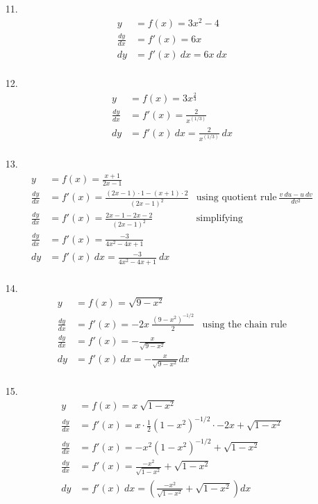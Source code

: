 \documentclass[12pt]{article}
\begin{document}
    \begin{enumerate}
        \item[11.] 
            \begin{align*}
            y &= f(x) = 3x^2 - 4 \\
            \frac{dy}{dx} &= f'(x) = 6x \\
            dy &= f'(x)~dx = 6x~dx\\
            \end{align*}

        \item[12.] 
            \begin{align*}
            y &= f(x) = 3x^{\frac{2}{3}} \\
            \frac{dy}{dx} &= f'(x) = \frac{2}{x^(1/3)}\\
            dy &= f'(x)~dx = \frac{2}{x^(1/3)}~dx\\
            \end{align*}

        \item[13.] 
            \begin{align*}
            y &= f(x) = \frac{x+1}{2x-1} \\
            \frac{dy}{dx} &= f'(x) = \frac{(2x-1)\cdot1 - (x+1)\cdot2}{(2x-1)^2} & \text{using quotient rule}~\frac{v~du - u~dv}{dv^2}\\
        	 \frac{dy}{dx} &= f'(x) = \frac{2x-1 -2x-2}{(2x-1)^2} & \text{simplifying} \\
        	\frac{dy}{dx} &= f'(x) = \frac{-3}{4 x^2-4 x+1}\\
            dy &= f'(x)~dx = \frac{-3}{4 x^2-4 x+1}~dx\\
            \end{align*}

        \item[14.] 
            \begin{align*}
            y &= f(x) = \sqrt{9-x^2} \\
            \frac{dy}{dx} &= f'(x) = -2x~\frac{(9-x^2)^{-1/2}}{2} & \text{using the chain rule}\\
            \frac{dy}{dx} &= f'(x) = -\frac{x}{\sqrt{9 - x^2}}\\
            dy &= f'(x)~dx = -\frac{x}{\sqrt{9 - x^2}}dx\\
            \end{align*}

        \item[15.] 
            \begin{align*}
            y &= f(x) = x~\sqrt{1-x^2} \\
            \frac{dy}{dx} &= f'(x) = x \cdot \frac{1}{2}(1-x^2)^{-1/2}\cdot -2x + \sqrt{1-x^2}\\
            \frac{dy}{dx} &= f'(x) = -x^2(1-x^2)^{-1/2} + \sqrt{1-x^2}\\
            \frac{dy}{dx} &= f'(x) = \frac{-x^2}{\sqrt{1-x^2}} + \sqrt{1-x^2}\\
            dy &= f'(x)~dx = \left(\frac{-x^2}{\sqrt{1-x^2}} + \sqrt{1-x^2}\right)dx\\
            \end{align*}


\end{enumerate}
\end{document}
